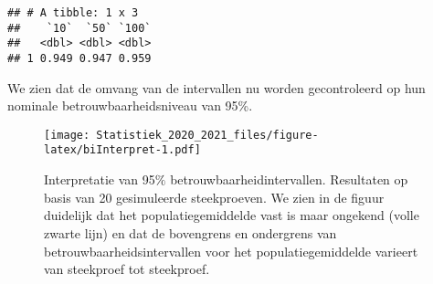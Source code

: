 \documentclass[
  12pt,dutch,coursenotes]{book}
\newenvironment{Shaded}{\begin{snugshade}}{\end{snugshade}}
\newcommand{\DataTypeTok}[1]{\textcolor[rgb]{0.13,0.29,0.53}{#1}}
\newcommand{\DecValTok}[1]{\textcolor[rgb]{0.00,0.00,0.81}{#1}}
\newcommand{\FloatTok}[1]{\textcolor[rgb]{0.00,0.00,0.81}{#1}}
\newcommand{\KeywordTok}[1]{\textcolor[rgb]{0.13,0.29,0.53}{\textbf{#1}}}
\newcommand{\NormalTok}[1]{#1}
\newcommand{\OperatorTok}[1]{\textcolor[rgb]{0.81,0.36,0.00}{\textbf{#1}}}
\newcommand{\StringTok}[1]{\textcolor[rgb]{0.31,0.60,0.02}{#1}}
\theoremstyle{definition}
\theoremstyle{definition}
\theoremstyle{definition}
\theoremstyle{remark}
\begin{document}
\begin{verbatim}
## # A tibble: 1 x 3
##    `10`  `50` `100`
##   <dbl> <dbl> <dbl>
## 1 0.949 0.947 0.959
\end{verbatim}

We zien dat de omvang van de intervallen nu worden gecontroleerd op hun nominale betrouwbaarheidsniveau van 95\%.

\begin{Shaded}
\end{Shaded}

\begin{figure}
\centering
\texttt{[image: Statistiek\_2020\_2021\_files/figure-latex/biInterpret-1.pdf]}
\caption{\label{fig:biInterpret}Interpretatie van 95\(\%\) betrouwbaarheidintervallen. Resultaten op basis van 20 gesimuleerde steekproeven. We zien in de figuur duidelijk dat het populatiegemiddelde vast is maar ongekend (volle zwarte lijn) en dat de bovengrens en ondergrens van betrouwbaarheidsintervallen voor het populatiegemiddelde varieert van steekproef tot steekproef.}
\end{figure}
\end{document}
